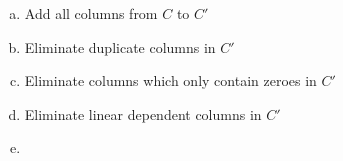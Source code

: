 
\begin{enumerate}[(a)]

\item Add all columns from $C$ to $C'$

\item Eliminate duplicate columns in $C'$

\item Eliminate columns which only contain zeroes in $C'$

\item Eliminate linear dependent columns in $C'$

\item {}

\end{enumerate}

